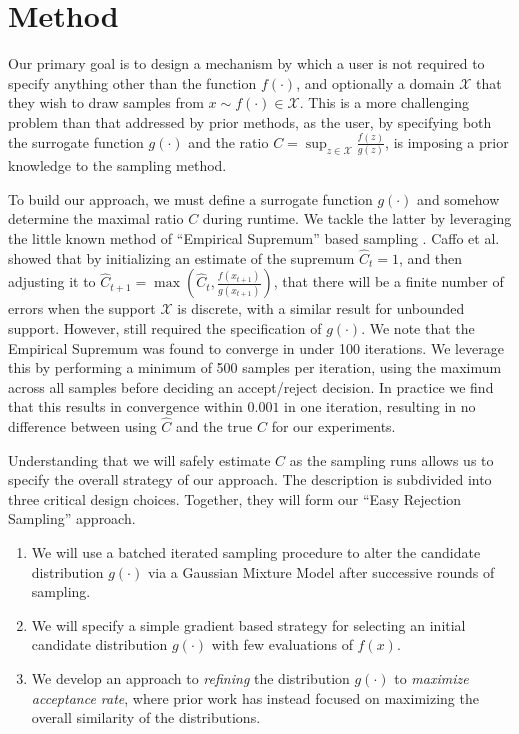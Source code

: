 \documentclass{ecai}  %
\begin{document}
\section{Method} \label{sec:method}

Our primary goal is to design a mechanism by which a user is not required to specify anything other than the function $f(\cdot)$, and optionally a domain $\mathcal{X}$ that they wish to draw samples from $x \sim f(\cdot) \in \mathcal{X}$. This is a more challenging problem than that addressed by prior methods, as the user, by specifying both the surrogate function $g(\cdot)$ and the ratio $C = \sup_{z \in \mathcal{X}} \frac{f(z)}{g(z)}$, is imposing a prior knowledge to the sampling method. 

To build our approach, we must define a surrogate function $g(\cdot)$ and somehow determine the maximal ratio $C$ during runtime. We tackle the latter by leveraging the little known method of ``Empirical Supremum'' based sampling \cite{Caffo2002}. 
%
Caffo et al.
showed that by initializing an estimate of the supremum $\hat{C}_t = 1$, and then adjusting it to $\hat{C}_{t+1} = \max\left(\hat{C}_t, \frac{f(x_{t+1})}{g(x_{t+1})}\right)$, 
%
that there will be a finite number of errors when the support $\mathcal{X}$ is discrete,
with a similar result for unbounded support. However, \cite{Caffo2002} still required the specification of $g(\cdot)$. We note that the Empirical Supremum was found to converge in under 100 iterations. We leverage this by performing a minimum of 500 samples per iteration, using the maximum across all samples before deciding an accept/reject decision. In practice we find that this results in  convergence within $0.001$ in one iteration, resulting in no difference between using $\hat{C}$ and the true $C$ for our experiments. 

Understanding that we will safely estimate $C$ as the sampling runs allows us to specify the overall strategy of our approach. The description is subdivided into three critical design choices. Together, they will form our ``Easy Rejection Sampling'' approach.
\begin{enumerate}
    \item We will use a batched iterated sampling procedure to alter the candidate distribution $g(\cdot)$ via a Gaussian Mixture Model after successive rounds of sampling. 
    \item We will specify a simple gradient based strategy for selecting an initial candidate distribution $g(\cdot)$ with few evaluations of $f(x)$.
    \item We develop an approach to \textit{refining} the distribution $g(\cdot)$ to \textit{maximize acceptance rate}, where prior work has instead focused on maximizing the overall similarity of the distributions. 
\end{enumerate}
\end{document}
